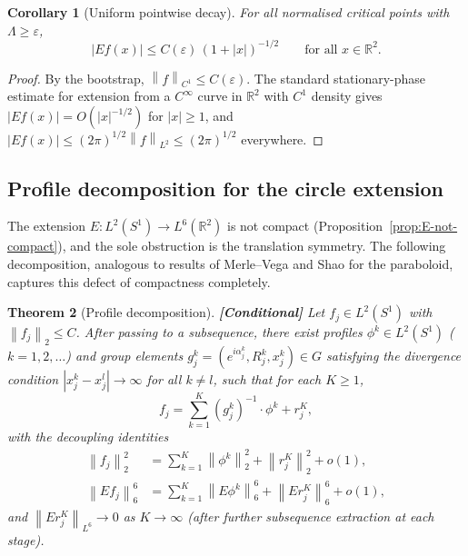 \documentclass[12pt]{article}
\newtheorem{theorem}{Theorem}[section]
\newtheorem{corollary}[theorem]{Corollary}
\theoremstyle{definition}
\theoremstyle{remark}
\newcommand{\R}{\mathbb{R}}
\newcommand{\norm}[1]{\left\|#1\right\|}
\newcommand{\conditional}{\textbf{\color{orange}[Conditional]}}
\begin{document}
\begin{corollary}[Uniform pointwise decay]
  \label{cor:uniform-decay}
  For all normalised critical points with $\Lambda\geq\varepsilon$,
  \[
    |Ef(x)|\leq C(\varepsilon)\,(1+|x|)^{-1/2}
    \qquad\text{for all }x\in\R^2.
  \]
\end{corollary}
\begin{proof}
  By the bootstrap, $\norm{f}_{C^1}\leq C(\varepsilon)$.  The standard
  stationary-phase estimate for extension from a $C^\infty$ curve in
  $\R^2$ with $C^1$ density gives $|Ef(x)|=O(|x|^{-1/2})$
  for $|x|\geq 1$, and
  $|Ef(x)|\leq(2\pi)^{1/2}\norm{f}_{L^2}\leq(2\pi)^{1/2}$ everywhere.
\end{proof}

\subsection{Profile decomposition for the circle extension}

The extension $E:L^2(S^1)\to L^6(\R^2)$ is not compact
(Proposition~\ref{prop:E-not-compact}), and the sole obstruction is
the translation symmetry.  The following decomposition, analogous to
results of Merle--Vega and Shao for the paraboloid, captures this
defect of compactness completely.

\begin{theorem}[Profile decomposition]
  \label{thm:profile-decomp}
  \conditional\quad
  Let $f_j\in L^2(S^1)$ with $\norm{f_j}_2\leq C$.  After passing
  to a subsequence, there exist profiles $\phi^k\in L^2(S^1)$
  ($k=1,2,\ldots$) and group elements
  $g_j^k=(e^{i\alpha_j^k},R_j^k,x_j^k)\in G$ satisfying the
  \emph{divergence condition}
  $|x_j^k-x_j^l|\to\infty$ for all $k\neq l$,
  such that for each $K\geq 1$,
  \begin{equation}\label{eq:profile-decomp}
    f_j = \sum_{k=1}^K(g_j^k)^{-1}\cdot\phi^k + r_j^K,
  \end{equation}
  with the decoupling identities
  \begin{align}
    \norm{f_j}_2^2
    &= \textstyle\sum_{k=1}^K\norm{\phi^k}_2^2
      + \norm{r_j^K}_2^2 + o(1),
    \label{eq:L2-decouple}\\
    \norm{Ef_j}_6^6
    &= \textstyle\sum_{k=1}^K\norm{E\phi^k}_6^6
      + \norm{Er_j^K}_6^6 + o(1),
    \label{eq:L6-decouple}
  \end{align}
  and $\norm{Er_j^K}_{L^6}\to 0$ as $K\to\infty$ (after further
  subsequence extraction at each stage).
\end{theorem}
\end{document}
